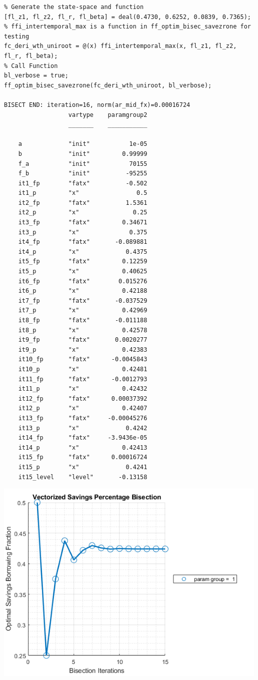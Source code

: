 \documentclass[
]{book}
\begin{document}
\begin{verbatim}
% Generate the state-space and function
[fl_z1, fl_z2, fl_r, fl_beta] = deal(0.4730, 0.6252, 0.0839, 0.7365);
% ffi_intertemporal_max is a function in ff_optim_bisec_savezrone for testing
fc_deri_wth_uniroot = @(x) ffi_intertemporal_max(x, fl_z1, fl_z2, fl_r, fl_beta);
% Call Function
bl_verbose = true;
ff_optim_bisec_savezrone(fc_deri_wth_uniroot, bl_verbose);

BISECT END: iteration=16, norm(ar_mid_fx)=0.00016724
                  vartype    paramgroup2
                  _______    ___________

    a             "init"           1e-05
    b             "init"         0.99999
    f_a           "init"           70155
    f_b           "init"          -95255
    it1_fp        "fatx"          -0.502
    it1_p         "x"                0.5
    it2_fp        "fatx"          1.5361
    it2_p         "x"               0.25
    it3_fp        "fatx"         0.34671
    it3_p         "x"              0.375
    it4_fp        "fatx"       -0.089881
    it4_p         "x"             0.4375
    it5_fp        "fatx"         0.12259
    it5_p         "x"            0.40625
    it6_fp        "fatx"        0.015276
    it6_p         "x"            0.42188
    it7_fp        "fatx"       -0.037529
    it7_p         "x"            0.42969
    it8_fp        "fatx"       -0.011188
    it8_p         "x"            0.42578
    it9_fp        "fatx"       0.0020277
    it9_p         "x"            0.42383
    it10_fp       "fatx"      -0.0045843
    it10_p        "x"            0.42481
    it11_fp       "fatx"      -0.0012793
    it11_p        "x"            0.42432
    it12_fp       "fatx"      0.00037392
    it12_p        "x"            0.42407
    it13_fp       "fatx"     -0.00045276
    it13_p        "x"             0.4242
    it14_fp       "fatx"     -3.9436e-05
    it14_p        "x"            0.42413
    it15_fp       "fatx"      0.00016724
    it15_p        "x"             0.4241
    it15_level    "level"       -0.13158
\end{verbatim}

\includegraphics[width=5.20833in,height=\textheight]{img/fx_optim_bisec_savezrone_images/figure_1.png}
\end{document}
